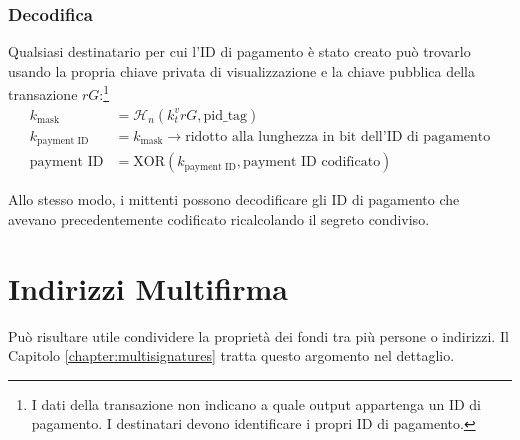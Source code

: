 \subsubsection*{Decodifica}

Qualsiasi destinatario per cui l’ID di pagamento è stato creato può trovarlo usando la propria chiave privata di visualizzazione e la chiave pubblica della transazione $r G$:\footnote{I dati della transazione non indicano a quale output appartenga un ID di pagamento. I destinatari devono identificare i propri ID di pagamento.}\vspace{.175cm}
\begin{align*}
         k_{\textrm{mask}} &= \mathcal{H}_n(k_t^v r G,\textrm{pid\_tag}) \\
      k_{\textrm{payment ID}} &= k_{\textrm{mask}} \rightarrow \textrm{ridotto alla lunghezza in bit dell’ID di pagamento}\\
          \textrm{payment ID} &= \textrm{XOR}(k_{\textrm{payment ID}}, \textrm{payment ID codificato})
\end{align*}

Allo stesso modo, i mittenti possono decodificare gli ID di pagamento che avevano precedentemente codificato ricalcolando il segreto condiviso.



\section{Indirizzi Multifirma}
\label{sec:multisignature-addresses}

Può risultare utile condividere la proprietà dei fondi tra più persone o indirizzi. Il Capitolo \ref{chapter:multisignatures} tratta questo argomento nel dettaglio.
